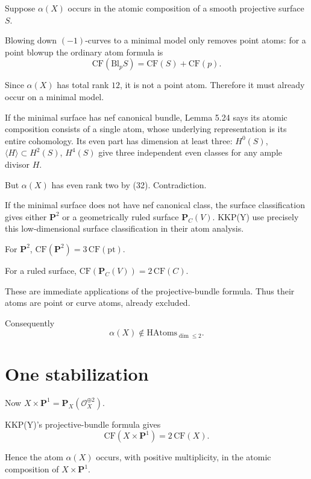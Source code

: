 \documentclass[11pt]{article}
\theoremstyle{definition}
\theoremstyle{remark}
\newcommand{\PP}{\mathbf P}
\begin{document}
Suppose $\alpha(X)$ occurs in the atomic composition of a smooth projective
surface $S$.

Blowing down $(-1)$-curves to a minimal model only removes point atoms: for a
point blowup the ordinary atom formula is
\begin{equation}
  \mathrm{CF}(\mathrm{Bl}_pS)=\mathrm{CF}(S)+\mathrm{CF}(p).
  \tag{41}
\end{equation}

Since $\alpha(X)$ has total rank $12$, it is not a point atom. Therefore it must
already occur on a minimal model.

If the minimal surface has nef canonical bundle, Lemma 5.24 says its atomic
composition consists of a single atom, whose underlying representation is its
entire cohomology. Its even part has dimension at least three: $H^0(S)$,
$\langle H\rangle\subset H^2(S)$, $H^4(S)$ give three independent even classes
for any ample divisor $H$.

But $\alpha(X)$ has even rank two by (32). Contradiction.

If the minimal surface does not have nef canonical class, the surface
classification gives either $\PP^2$ or a geometrically ruled surface
$\PP_C(V)$. KKP(Y) use precisely this low-dimensional surface classification in
their atom analysis.

For $\PP^2$, $\mathrm{CF}(\PP^2)=3\,\mathrm{CF}(\mathrm{pt})$.

For a ruled surface, $\mathrm{CF}(\PP_C(V))=2\,\mathrm{CF}(C)$.

These are immediate applications of the projective-bundle formula. Thus their
atoms are point or curve atoms, already excluded.

Consequently
\begin{equation}
  \boxed{\ \alpha(X)\notin\mathrm{HAtoms}_{\dim\le2}.\ }
  \tag{42}
\end{equation}

\section{One stabilization}

Now $X\times\PP^1=\PP_X(\mathcal O_X^{\oplus2})$.

KKP(Y)'s projective-bundle formula gives
\begin{equation}
  \mathrm{CF}(X\times\PP^1)=2\,\mathrm{CF}(X).
  \tag{43}
\end{equation}

Hence the atom $\alpha(X)$ occurs, with positive multiplicity, in the atomic
composition of $X\times\PP^1$.
\end{document}
